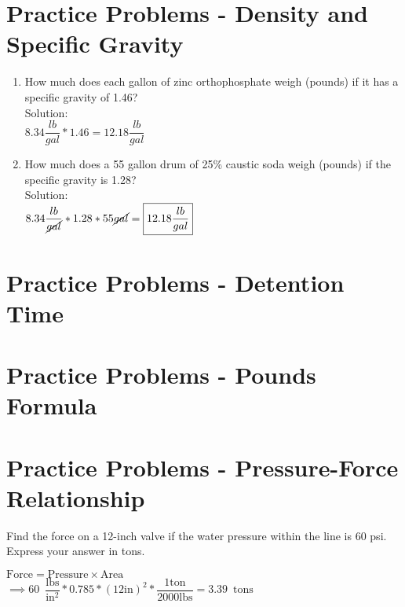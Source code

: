 \section*{Practice Problems - Density and Specific Gravity}
\begin{enumerate}


\item How much does each gallon of zinc orthophosphate weigh (pounds) if it has a specific gravity of 1.46?\\
\vspace{0.2cm}
Solution:\\
\vspace{0.2cm}
$8.34\dfrac{lb}{gal}*1.46=\boxed{12.18\dfrac{lb}{gal}}$
\vspace{0.2cm}
\item How much does a 55 gallon drum of 25\% caustic soda weigh (pounds) if the specific gravity is 1.28?\\
\vspace{0.2cm}
Solution:\\
\vspace{0.2cm}
$8.34\dfrac{lb}{\cancel{gal}}*1.28*55\cancel{gal}=\boxed{12.18\dfrac{lb}{gal}}$
\vspace{0.2cm}
\end{enumerate}

\section*{Practice Problems - Detention Time}


\section*{Practice Problems - Pounds Formula}



\section*{Practice Problems - Pressure-Force Relationship}

 \item Find the force on a 12-inch valve if the water pressure within the line is 60 psi. Express your answer in tons.

$\textrm{Force}= \textrm{Pressure} \times \textrm{Area}$\\
\vspace{0.3cm}
$\implies 60 \enspace \dfrac{\mathrm{lbs}}{\mathrm{in^2}}*0.785 *(12 \mathrm{in})^2*\dfrac{1 \mathrm{ton}}{2000 \mathrm{lbs}} =\boxed{3.39 \enspace\mathrm{tons}}$
\vspace{0.3cm}

